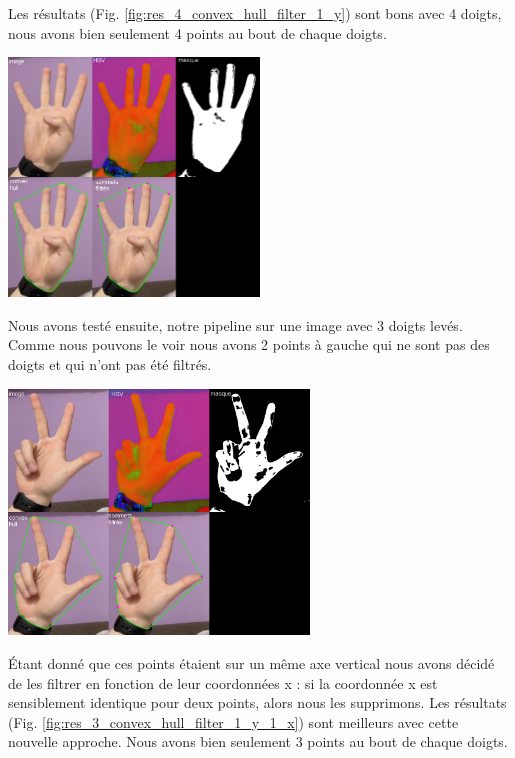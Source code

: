 \documentclass[11pt]{article}
\begin{document}
Les résultats (Fig. \ref{fig:res_4_convex_hull_filter_1_y}) sont bons avec 4 doigts, nous avons bien seulement 4 points au bout de chaque doigts.
\begin{center}
    \includegraphics[width=0.5\textwidth]{images/res_4_convex_hull_filter_1_y.png}
    \label{fig:res_4_convex_hull_filter_1_y}
\end{center}
\newpage
Nous avons testé ensuite, notre pipeline sur une image avec 3 doigts levés.
Comme nous pouvons le voir nous avons 2 points à gauche qui ne sont pas des doigts et qui n'ont pas été filtrés.
\begin{center}
    \includegraphics[width=0.6\textwidth]{images/res_3_convex_hull_filter_1_y.png}
    \label{fig:res_3_convex_hull_filter_1_y}
\end{center}
\bigbreak
\'Etant donné que ces points étaient sur un même axe vertical nous avons décidé de les filtrer en fonction de leur coordonnées x : si la coordonnée x est sensiblement identique pour deux points, alors nous les supprimons.
Les résultats (Fig. \ref{fig:res_3_convex_hull_filter_1_y_1_x}) sont meilleurs avec cette nouvelle approche. Nous avons bien seulement 3 points au bout de chaque doigts.
\end{document}
